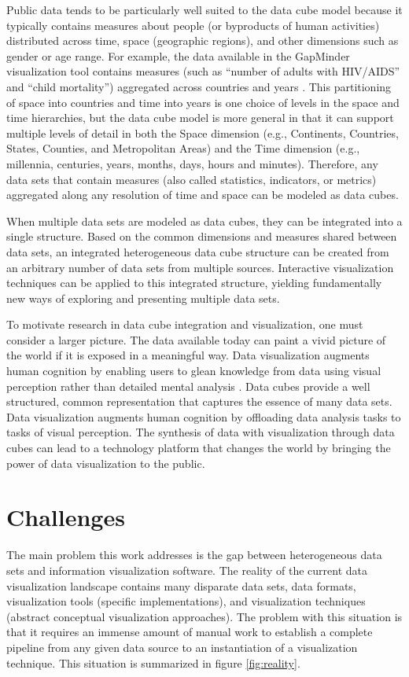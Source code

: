 Public data tends to be particularly well suited to the data cube model because it typically contains measures about people (or byproducts of human activities) distributed across time, space (geographic regions), and other dimensions such as gender or age range. For example, the data available in the GapMinder visualization tool contains measures (such as ``number of adults with HIV/AIDS'' and ``child mortality'') aggregated across countries and years \cite{gapminderData}. This partitioning of space into countries and time into years is one choice of levels in the space and time hierarchies, but the data cube model is more general in that it can support multiple levels of detail in both the Space dimension (e.g., Continents, Countries, States, Counties, and Metropolitan Areas) and the Time dimension (e.g., millennia, centuries, years, months, days, hours and minutes). Therefore, any data sets that contain measures (also called statistics, indicators, or metrics) aggregated along any resolution of time and space can be modeled as data cubes.

When multiple data sets are modeled as data cubes, they can be integrated into a single structure. Based on the common dimensions and measures shared between data sets, an integrated heterogeneous data cube structure can be created from an arbitrary number of data sets from multiple sources. Interactive visualization techniques can be applied to this integrated structure, yielding fundamentally new ways of exploring and presenting multiple data sets.

To motivate research in data cube integration and visualization, one must consider a larger picture. The data available today can paint a vivid picture of the world if it is exposed in a meaningful way. Data visualization augments human cognition by enabling users to glean knowledge from data using visual perception rather than detailed mental analysis \cite{card1999readings}. Data cubes provide a well structured, common representation that captures the essence of many data sets. Data visualization augments human cognition by offloading data analysis tasks to tasks of visual perception. The synthesis of data with visualization through data cubes can lead to a technology platform that changes the world by bringing the power of data visualization to the public.

\section{Challenges}
The main problem this work addresses is the gap between heterogeneous data sets and information visualization software. The reality of the current data visualization landscape contains many disparate data sets, data formats, visualization tools (specific implementations), and visualization techniques (abstract conceptual visualization approaches). The problem with this situation is that it requires an immense amount of manual work to establish a complete pipeline from any given data source to an instantiation of a visualization technique. This situation is summarized in figure \ref{fig:reality}.

